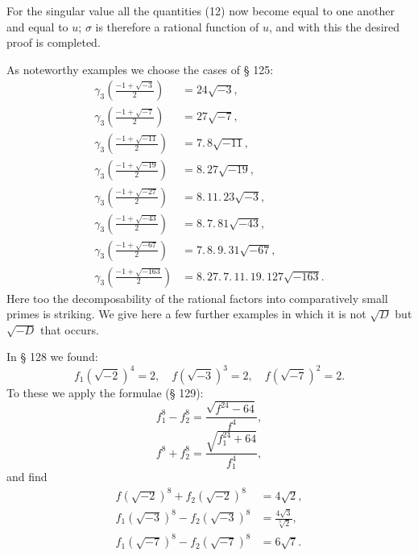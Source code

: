 
For the singular value all the quantities (12) now become equal
to one another and equal to $u$; $\sigma$ is therefore a rational function of
$u$, and with this the desired proof is completed.

As noteworthy examples we choose the cases of § 125:
\[
\begin{aligned}
\gamma_3\left(\frac{-1+\sqrt{-3}}{2}\right) &= 24\sqrt{-3}, \\
\gamma_3\left(\frac{-1+\sqrt{-7}}{2}\right) &= 27\sqrt{-7}, \\
\gamma_3\left(\frac{-1+\sqrt{-11}}{2}\right) &= 7.\,8\sqrt{-11}, \\
\gamma_3\left(\frac{-1+\sqrt{-19}}{2}\right) &= 8.\,27\sqrt{-19}, \\
\gamma_3\left(\frac{-1+\sqrt{-27}}{2}\right) &= 8.\,11.\,23\sqrt{-3}, \\
\gamma_3\left(\frac{-1+\sqrt{-43}}{2}\right) &= 8.\,7.\,81\sqrt{-43}, \\
\gamma_3\left(\frac{-1+\sqrt{-67}}{2}\right) &= 7.\,8.\,9.\,31\sqrt{-67}, \\ %
\gamma_3\left(\frac{-1+\sqrt{-163}}{2}\right) &= 8.\,27.\,7.\,11.\,19.\,127\sqrt{-163}.
\end{aligned}
\]
Here too the decomposability of the rational factors into comparatively small primes is striking. We give here a few
further examples in which it is not $\sqrt{D}$ but $\sqrt{-D}$ that occurs.

In § 128 we found:
\[
f_1(\sqrt{-2})^4 = 2, \quad f(\sqrt{-3})^3 = 2, \quad f(\sqrt{-7})^2 = 2.
\]
To these we apply the formulae (§ 129):
\[
f_1^8 - f_2^8 = \frac{\sqrt{f^{24} - 64}}{f^4},
\]
\[
f^8 + f_2^8 = \frac{\sqrt{f_1^{24} + 64}}{f_1^4},
\]
and find
\[
\begin{aligned}
f(\sqrt{-2})^8 + f_2(\sqrt{-2})^8 &= 4\sqrt{2}, \\
f_1(\sqrt{-3})^8 - f_2(\sqrt{-3})^8 &= \frac{4\sqrt{3}}{\sqrt[3]{2}}, \\
f_1(\sqrt{-7})^8 - f_2(\sqrt{-7})^8 &= 6\sqrt{7}.
\end{aligned}
\]

